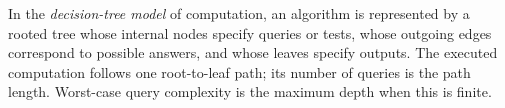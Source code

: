 
In the \emph{decision-tree model} of computation, an algorithm is represented by a rooted tree whose internal nodes specify queries or tests, whose outgoing edges correspond to possible answers, and whose leaves specify outputs. The executed computation follows one root-to-leaf path; its number of queries is the path length. Worst-case query complexity is the maximum depth when this is finite.

